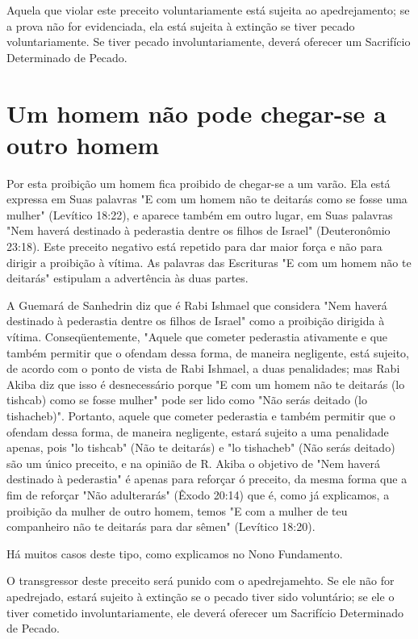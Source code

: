 \begin{itemize}
\begin{enumrate}
\begin{itemize}
\begin{itemize}
\begin{itemize}
Aquela que violar este preceito voluntariamente está sujeita ao
ape­drejamento; se a prova não for evidenciada, ela está sujeita à
extinção se tiver pecado voluntariamente. Se tiver pecado
involuntariamente, deverá oferecer um Sacrifício Determinado de Pecado.

\section{Um homem não pode chegar-se a outro homem}

Por esta proibição um homem fica proibido de chegar-se a um va­rão. Ela
está expressa em Suas palavras "E com um homem não te deitarás co­mo se
fosse uma mulher" (Levítico 18:22), e aparece também em outro lugar, em
Suas palavras "Nem haverá destinado à pederastia dentre os filhos de
Is­rael" (Deuteronômio 23:18). Este preceito negativo está repetido para
dar maior força e não para dirigir a proibição à vítima. As palavras das
Escrituras "E com um homem não te deitarás" estipulam a advertência às
duas partes.

A Guemará de Sanhedrin diz que é Rabi Ishmael que considera "Nem haverá
destinado à pederastia dentre os filhos de Israel" como a proibição
diri­gida à vítima. Conseqüentemente, "Aquele que cometer pederastia
ativamen­te e que também permitir que o ofendam dessa forma, de maneira
negligente, está sujeito, de acordo com o ponto de vista de Rabi
Ishmael, a duas penalida­des; mas Rabi Akiba diz que isso é
desnecessário porque "E com um homem não te deitarás (lo tishcab) como
se fosse mulher" pode ser lido como "Não serás deitado (lo tishacheb)".
Portanto, aquele que cometer pederastia e também permitir que
o ofendam dessa forma, de maneira negligente, estará
sujeito a uma penalidade apenas, pois "lo tishcab" (Não te deitarás) e
"lo tishacheb" (Não serás deitado) são um único preceito, e na opinião
de R. Akiba o objetivo de "Nem haverá destinado à pederastia" é apenas
para reforçar ó preceito, da mesma forma que a fim de reforçar "Não
adulterarás" (Êxodo 20:14) que é, como já explicamos, a proibição da
mulher de outro homem, temos "E com a mulher de teu companheiro não te
deitarás para dar sêmen" (Levítico 18:20).


Há muitos casos deste tipo, como explicamos no Nono Fundamento.


O transgressor deste preceito será punido com o apedrejamehto. Se ele
não for apedrejado, estará sujeito à extinção se o pecado tiver sido
voluntá­rio; se ele o tiver cometido involuntariamente, ele deverá
oferecer um Sacrifí­cio Determinado de Pecado.


\end{itemize}
\end{itemize}
\end{itemize}
\end{enumrate}
\end{itemize}
